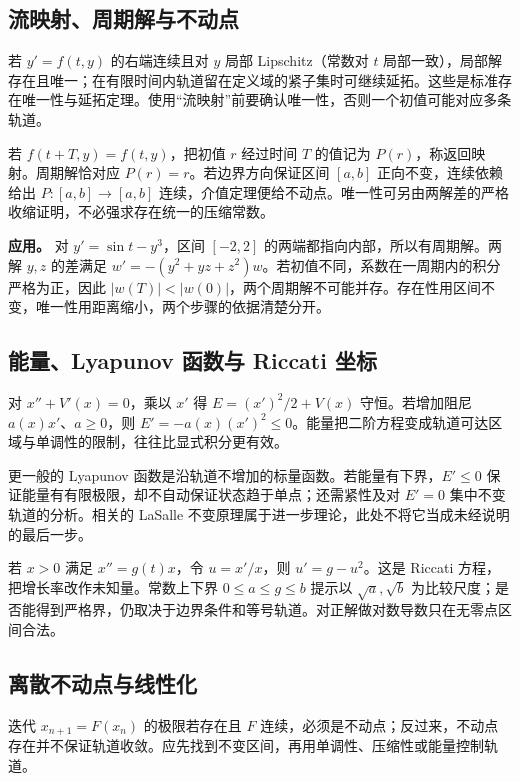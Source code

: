 \documentclass[UTF8,12pt,a4paper,fontset=fandol]{ctexart}
\begin{document}
\subsection{流映射、周期解与不动点}

\label{app:dynamics-flow}

若 $y'=f(t,y)$ 的右端连续且对 $y$ 局部 Lipschitz（常数对 $t$ 局部一致），局部解存在且唯一；在有限时间内轨道留在定义域的紧子集时可继续延拓。这些是标准存在唯一性与延拓定理。使用“流映射”前要确认唯一性，否则一个初值可能对应多条轨道。

若 $f(t+T,y)=f(t,y)$，把初值 $r$ 经过时间 $T$ 的值记为 $P(r)$，称返回映射。周期解恰对应 $P(r)=r$。若边界方向保证区间 $[a,b]$ 正向不变，连续依赖给出 $P:[a,b]\to[a,b]$ 连续，介值定理便给不动点。唯一性可另由两解差的严格收缩证明，不必强求存在统一的压缩常数。

\textbf{应用。} 对 $y'=\sin t-y^3$，区间 $[-2,2]$ 的两端都指向内部，所以有周期解。两解 $y,z$ 的差满足 $w'=-(y^2+yz+z^2)w$。若初值不同，系数在一周期内的积分严格为正，因此 $|w(T)|<|w(0)|$，两个周期解不可能并存。存在性用区间不变，唯一性用距离缩小，两个步骤的依据清楚分开。

\subsection{能量、Lyapunov 函数与 Riccati 坐标}

\label{app:dynamics-energy}

对 $x''+V'(x)=0$，乘以 $x'$ 得 $E=(x')^2/2+V(x)$ 守恒。若增加阻尼 $a(x)x'$、$a\geq0$，则 $E'=-a(x)(x')^2\leq0$。能量把二阶方程变成轨道可达区域与单调性的限制，往往比显式积分更有效。

更一般的 Lyapunov 函数是沿轨道不增加的标量函数。若能量有下界，$E'\leq0$ 保证能量有有限极限，却不自动保证状态趋于单点；还需紧性及对 $E'=0$ 集中不变轨道的分析。相关的 LaSalle 不变原理属于进一步理论，此处不将它当成未经说明的最后一步。

若 $x>0$ 满足 $x''=g(t)x$，令 $u=x'/x$，则 $u'=g-u^2$。这是 Riccati 方程，把增长率改作未知量。常数上下界 $0\leq a\leq g\leq b$ 提示以 $\sqrt a,\sqrt b$ 为比较尺度；是否能得到严格界，仍取决于边界条件和等号轨道。对正解做对数导数只在无零点区间合法。

\subsection{离散不动点与线性化}

\label{app:dynamics-iteration}

迭代 $x_{n+1}=F(x_n)$ 的极限若存在且 $F$ 连续，必须是不动点；反过来，不动点存在并不保证轨道收敛。应先找到不变区间，再用单调性、压缩性或能量控制轨道。
\end{document}
